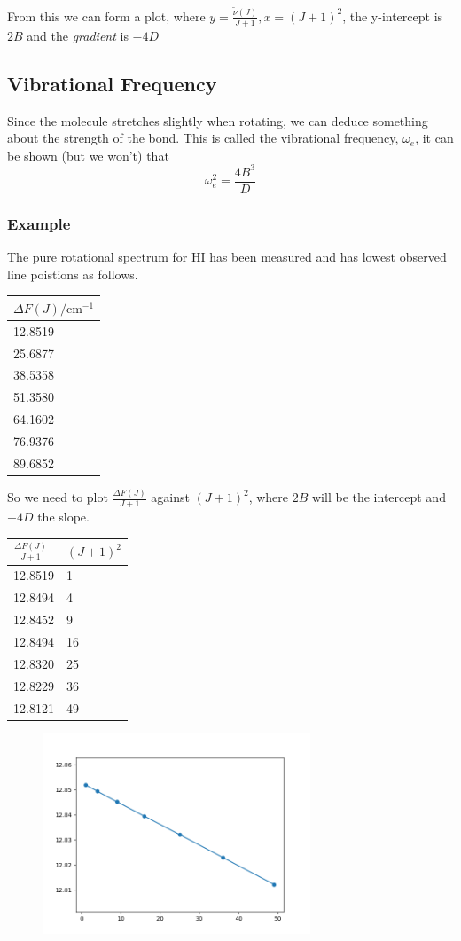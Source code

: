 \documentclass{article}
\begin{document}
    From this we can form a plot, where $y = \frac{\tilde{\nu}(J)}{J+1}, x = (J+1)^2$, the y-intercept is $2B$
    and the \emph{gradient} is $-4D$

    \newpage

    \subsection{Vibrational Frequency}
    Since the molecule stretches slightly when rotating, we can deduce something about the strength of the bond.
    This is called the vibrational frequency, $\omega_e$, it can be shown (but we won't) that
    $$\omega_e^2 = \frac{4B^3}{D}$$ 

    \subsubsection{Example}
    The pure rotational spectrum for HI has been measured and has lowest observed line poistions as follows.

    \begin{tabular}{l}
        $\Delta F(J) / \text{cm}^{-1}$ \\
        \hline
        12.8519\\
        25.6877\\
        38.5358\\
        51.3580\\
        64.1602\\
        76.9376\\
        89.6852\\
    \end{tabular}

    So we need to plot $\frac{\Delta F(J)}{J+1}$ against $(J+1)^2$, where $2B$ will be the intercept and $-4D$ the slope.

    \begin{tabular}{l l}
        $\frac{\Delta F(J)}{J+1}$ & $(J+1)^2$\\
        \hline
        12.8519 & 1\\
        12.8494 & 4\\
        12.8452 & 9\\
        12.8494 & 16\\
        12.8320 & 25\\
        12.8229 & 36\\
        12.8121 & 49
    \end{tabular}
    \begin{figure}[h]
        \includegraphics[width=8cm]{Figure_1.png}
    \end{figure}
\end{document}

